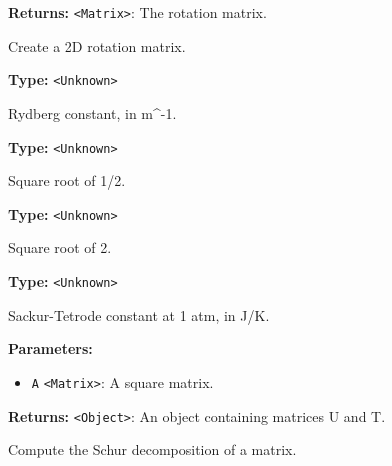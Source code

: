 \documentclass[12pt,a4paper]{article}
\begin{document}
\noindent \textbf{Returns:} \texttt{<Matrix>}: The rotation matrix.

\noindent Create a 2D rotation matrix.

\vspace{5mm}
\noindent {}\vspace{4mm}


\noindent \textbf{Type:} \texttt{<Unknown>}

\noindent Rydberg constant, in m\textasciicircum{}-1.

\vspace{5mm}
\noindent {}\vspace{4mm}


\noindent \textbf{Type:} \texttt{<Unknown>}

\noindent Square root of 1/2.

\vspace{5mm}
\noindent {}\vspace{4mm}


\noindent \textbf{Type:} \texttt{<Unknown>}

\noindent Square root of 2.

\vspace{5mm}
\noindent {}\vspace{4mm}


\noindent \textbf{Type:} \texttt{<Unknown>}

\noindent Sackur-Tetrode constant at 1 atm, in J/K.

\vspace{5mm}
\noindent {}


\noindent \textbf{Parameters:}
\begin{itemize}
  \item \texttt{A} \texttt{<Matrix>}: A square matrix.
\end{itemize}

\noindent \textbf{Returns:} \texttt{<Object>}: An object containing matrices U and T.

\noindent Compute the Schur decomposition of a matrix.
\end{document}

